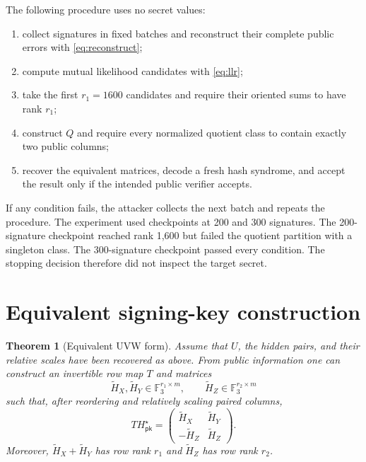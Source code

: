 \documentclass[11pt,a4paper]{article}
\newtheorem{theorem}{Theorem}
\newcommand{\F}{\mathbb{F}}
\newcommand{\pk}{\mathsf{pk}}
\begin{document}
The following procedure uses no secret values:
\begin{enumerate}[leftmargin=1.7em]
  \item collect signatures in fixed batches and reconstruct their complete
        public errors with \eqref{eq:reconstruct};
  \item compute mutual likelihood candidates with \eqref{eq:llr};
  \item take the first $r_1=1600$ candidates and require their oriented sums
        to have rank $r_1$;
  \item construct $Q$ and require every normalized quotient class to contain
        exactly two public columns;
  \item recover the equivalent matrices, decode a fresh hash syndrome, and
        accept the result only if the intended public verifier accepts.
\end{enumerate}
If any condition fails, the attacker collects the next batch and repeats the
procedure.  The experiment used checkpoints at 200 and 300 signatures.  The 200-signature checkpoint
reached rank 1,600 but failed the quotient partition with a singleton class.
The 300-signature checkpoint passed every condition.  The stopping decision
therefore did not inspect the target secret.

\section{Equivalent signing-key construction}

\begin{theorem}[Equivalent UVW form]
\label{thm:equiv}
Assume that $U$, the hidden pairs, and their relative scales have been
recovered as above.  From public information one can construct an invertible
row map $T$ and matrices
\[
 \widetilde H_X,\widetilde H_Y\in\F_3^{r_1\times m},
 \qquad
 \widetilde H_Z\in\F_3^{r_2\times m}
\]
such that, after reordering and relatively scaling paired columns,
\begin{equation}
       T H_{\pk}^{\star}=
       \begin{pmatrix}
        \widetilde H_X&\widetilde H_Y\\
        -\widetilde H_Z&\widetilde H_Z
       \end{pmatrix}.
 \label{eq:equiv}
\end{equation}
Moreover, $\widetilde H_X+\widetilde H_Y$ has row rank $r_1$ and
$\widetilde H_Z$ has row rank $r_2$.
\end{theorem}
\end{document}
